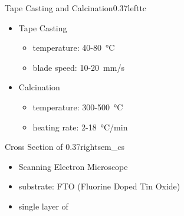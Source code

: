 \documentclass[hyperref={pdfpagelabels=false}, aspectratio=43, t]{beamer}  %
\begin{document}
\begin{graphicsFrame}{Tape Casting and Calcination}{}{0.37}{left}{tc}{}

		\vspace{1em}
		\begin{itemize}
			\item Tape Casting
				\begin{itemize}
					\item temperature: 40-80\SI{}{\degreeCelsius}
					\item blade speed: 10-20\SI{}{\milli\meter/\second}
				\end{itemize}
				\vspace{1em}
			\item Calcination
				\begin{itemize}
					\item temperature: 300-500\SI{}{\degreeCelsius}
					\item heating rate: 2-18\SI{}{\degreeCelsius/\minute}
				\end{itemize}
		\end{itemize}
\end{graphicsFrame}

\begin{graphicsFrame}{Cross Section of }{}{0.37}{right}{sem_cs}{}
	\vspace{3em}
		\begin{itemize}
			\item Scanning Electron Microscope 
			\item substrate: FTO (Fluorine Doped Tin Oxide)
			\item single layer of 
		\end{itemize}
\end{graphicsFrame}
\end{document}

